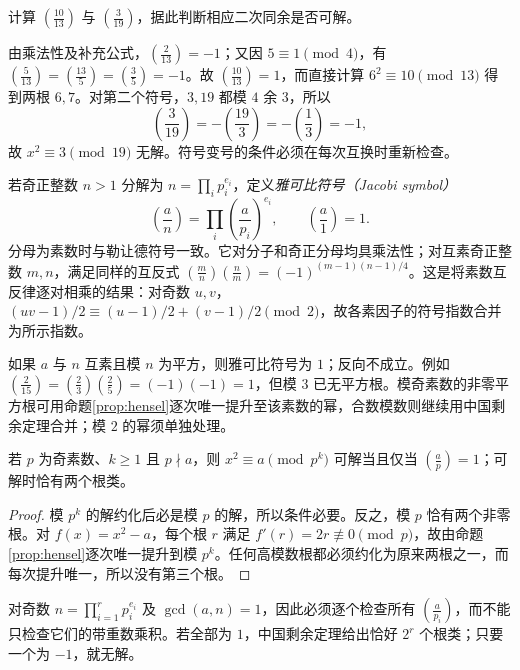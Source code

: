 \begin{example}[分解、互反与取余配合使用]
计算 $\left(\frac{10}{13}\right)$ 与 $\left(\frac3{19}\right)$，据此判断相应二次同余是否可解。
\end{example}
\begin{solve}
由乘法性及补充公式，$\left(\frac2{13}\right)=-1$；又因 $5\equiv1\pmod4$，有 $\left(\frac5{13}\right)=\left(\frac{13}5\right)=\left(\frac35\right)=-1$。故 $\left(\frac{10}{13}\right)=1$，而直接计算 $6^2\equiv10\pmod{13}$ 得到两根 $6,7$。对第二个符号，$3,19$ 都模 $4$ 余 $3$，所以
\[
 \left(\frac3{19}\right)=-\left(\frac{19}3\right)
 =-\left(\frac13\right)=-1,
\]
故 $x^2\equiv3\pmod{19}$ 无解。符号变号的条件必须在每次互换时重新检查。
\end{solve}

若奇正整数 $n>1$ 分解为 $n=\prod_i p_i^{e_i}$，定义\emph{雅可比符号（Jacobi symbol）}
\[
 \left(\frac an\right)=\prod_i\left(\frac a{p_i}\right)^{e_i},
 \qquad \left(\frac a1\right)=1.
\]
分母为素数时与勒让德符号一致。它对分子和奇正分母均具乘法性；对互素奇正整数 $m,n$，满足同样的互反式 $\left(\frac mn\right)\left(\frac nm\right)=(-1)^{(m-1)(n-1)/4}$。这是将素数互反律逐对相乘的结果：对奇数 $u,v$，$(uv-1)/2\equiv(u-1)/2+(v-1)/2\pmod2$，故各素因子的符号指数合并为所示指数。

如果 $a$ 与 $n$ 互素且模 $n$ 为平方，则雅可比符号为 $1$；反向不成立。例如 $\left(\frac2{15}\right)=\left(\frac23\right)\left(\frac25\right)=(-1)(-1)=1$，但模 $3$ 已无平方根。模奇素数的非零平方根可用命题\ref{prop:hensel}逐次唯一提升至该素数的幂，合数模数则继续用中国剩余定理合并；模 $2$ 的幂须单独处理。

\begin{proposition}[奇素数幂上的可逆平方]
\label{prop:odd-prime-square-roots}
若 $p$ 为奇素数、$k\ge1$ 且 $p\nmid a$，则 $x^2\equiv a\pmod{p^k}$ 可解当且仅当 $\left(\frac ap\right)=1$；可解时恰有两个根类。
\end{proposition}
\begin{proof}
模 $p^k$ 的解约化后必是模 $p$ 的解，所以条件必要。反之，模 $p$ 恰有两个非零根。对 $f(x)=x^2-a$，每个根 $r$ 满足 $f'(r)=2r\not\equiv0\pmod p$，故由命题\ref{prop:hensel}逐次唯一提升到模 $p^k$。任何高模数根都必须约化为原来两根之一，而每次提升唯一，所以没有第三个根。
\end{proof}

对奇数 $n=\prod_{i=1}^r p_i^{e_i}$ 及 $\gcd(a,n)=1$，因此必须逐个检查所有 $\left(\frac a{p_i}\right)$，而不能只检查它们的带重数乘积。若全部为 $1$，中国剩余定理给出恰好 $2^r$ 个根类；只要一个为 $-1$，就无解。

